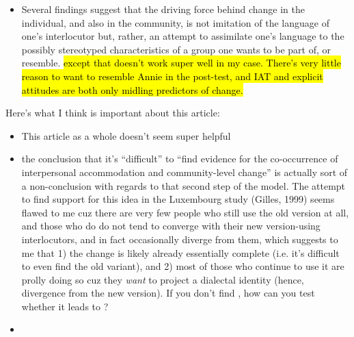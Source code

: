 \begin{itemize}
    \item Several findings suggest that the driving force behind change in the individual, and also in the community, is not imitation of the language of one’s interlocutor but, rather, an attempt to assimilate one’s language to the possibly stereotyped characteristics of a group one wants to be part of, or resemble. \hl{except that doesn't work super well in my case. There's very little reason to want to resemble Annie in the post-test, and IAT and explicit attitudes are both only midling predictors of change.}
\end{itemize}

Here's what I think is important about this article:

\begin{itemize}
    \item This article as a whole doesn't seem super helpful
    \item the conclusion that it's ``difficult'' to ``find evidence for the co-occurrence of interpersonal accommodation and community-level change'' is actually sort of a non-conclusion with regards to that second step of the model. The attempt to find support for this idea in the Luxembourg study (Gilles, 1999) seems flawed to me cuz there are very few people who still use the old version at all, and those who do do not tend to converge with their new version-using interlocutors, and in fact occasionally diverge from them, which suggests to me that 1) the change is likely already essentially complete (i.e. it's difficult to even find the old variant), and 2) most of those who continue to use it are prolly doing so cuz they \textit{want} to project a dialectal identity (hence, divergence from the new version). If you don't find \sta{}, how can you test whether it leads to \lta{}?
    \item 
\end{itemize}

